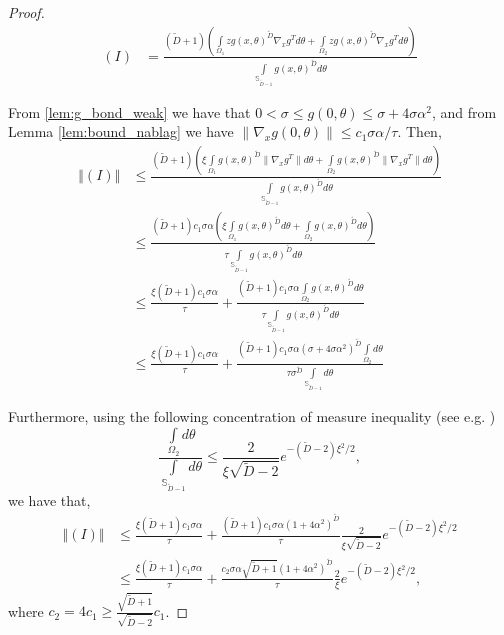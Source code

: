 \documentclass[12pt]{article}
\theoremstyle{remark}
\newcommand{\norm}[1]{\left\Vert #1 \right\Vert}
\newcommand{\wtilde}[1]{\widetilde{#1}}
\begin{document}
\begin{appendices}
\begin{proof}
\begin{align*}
    (I) &= \frac{(\wtilde D+1)\left(\int\limits_{\Omega_1}z g(x,\theta)^{\wtilde D} \nabla_x g^T d\theta + \int\limits_{\Omega_2}z g(x,\theta)^{\wtilde D} \nabla_x g^T d\theta \right) }
{\int\limits_{\mathbb{S}_{\wtilde D-1}}g(x,\theta)^{\wtilde D} d\theta} 
\end{align*}

From \ref{lem:g_bond_weak} we have that $0 < \sigma \leq g(0,\theta)\leq \sigma + 4\sigma\alpha^2$, and from Lemma \ref{lem:bound_nablag} we have $\|\nabla_x g(0,\theta)\|\leq c_1 \sigma \alpha/\tau$. Then,
\begin{align*}
\norm{(I)} &\leq \frac{(\wtilde D+1)\left(\xi\int\limits_{\Omega_1} g(x,\theta)^{\wtilde D} \|\nabla_x g^T\| d\theta + \int\limits_{\Omega_2} g(x,\theta)^{\wtilde D} \|\nabla_x g^T\| d\theta \right)}
{\int\limits_{\mathbb{S}_{\wtilde D-1}}g(x,\theta)^{\wtilde D} d\theta} \\
&\leq  \frac{(\wtilde D+1)c_1 \sigma \alpha \left(\xi\int\limits_{\Omega_1} g(x,\theta)^{\wtilde D}  d\theta + \int\limits_{\Omega_2} g(x,\theta)^{\wtilde D}  d\theta \right)}
{\tau\int\limits_{\mathbb{S}_{\wtilde D-1}}g(x,\theta)^{\wtilde D} d\theta}
\\
&\leq  \frac{\xi(\wtilde D+1)c_1 \sigma \alpha}{\tau} + \frac{(\wtilde D+1)c_1 \sigma \alpha \int\limits_{\Omega_2} g(x,\theta)^{\wtilde D}  d\theta }
{\tau\int\limits_{\mathbb{S}_{\wtilde D-1}}g(x,\theta)^{\wtilde D} d\theta}
\\
&\leq  \frac{\xi(\wtilde D+1)c_1 \sigma \alpha}{\tau} + \frac{(\wtilde D+1)c_1 \sigma \alpha ( \sigma + 4\sigma\alpha^2)^{\wtilde D}\int\limits_{\Omega_2}  d\theta }
{\tau \sigma^{\wtilde D}\int\limits_{\mathbb{S}_{\wtilde D-1}} d\theta}
\end{align*}

Furthermore, using the following concentration of measure inequality (see e.g. \cite{milman2009asymptotic,Venkatesan2012high})
\begin{equation}\label{eq:Omega3_to_ball_ratio}
\frac{\int\limits_{\Omega_2}  d\theta}{\int\limits_{\mathbb{S}_{\wtilde D-1}}  d\theta} \leq \frac{2}{\xi\sqrt{\wtilde D-2}}e^{-(\wtilde D - 2 )\xi^2/2}
,\end{equation}
we have that,
\begin{align*}
    \norm{(I)} 
&\leq  \frac{\xi(\wtilde D+1)c_1 \sigma\alpha}{\tau} + \frac{(\wtilde D+1)c_1 \sigma\alpha (1 + 4\alpha^2)^{\wtilde D} }
{\tau}\frac{2}{\xi\sqrt{\wtilde D-2}}e^{-(\wtilde D - 2 )\xi^2/2}
\\
&\leq  \frac{\xi(\wtilde D+1)c_1 \sigma\alpha}{\tau} + \frac{c_2 \sigma\alpha \sqrt{\wtilde D+1}( 1 + 4\alpha^2)^{\wtilde D} }
{\tau}\frac{2}{\xi}e^{-(\wtilde D - 2 )\xi^2/2}
,\end{align*}
where $c_2 = 4c_1 \geq \frac{\sqrt{\wtilde D +1}}{\sqrt{\wtilde D - 2}} c_1$.


\end{proof}
\end{appendices}
\end{document}
